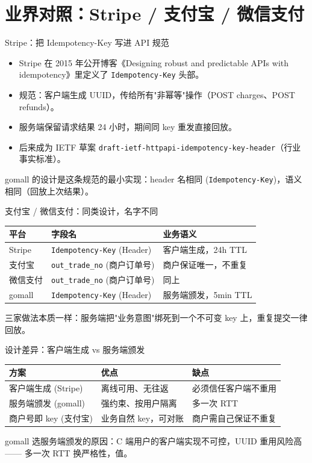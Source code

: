 \section{业界对照：Stripe / 支付宝 / 微信支付}

\begin{frame}{Stripe：把 Idempotency-Key 写进 API 规范}
\begin{itemize}
  \item Stripe 在 2015 年公开博客《Designing robust and predictable APIs with idempotency》里定义了 \texttt{Idempotency-Key} 头部。
  \item 规范：客户端生成 UUID，传给所有"非幂等"操作（POST charges、POST refunds）。
  \item 服务端保留请求结果 24 小时，期间同 key 重发直接回放。
  \item 后来成为 IETF 草案 \texttt{draft-ietf-httpapi-idempotency-key-header}（行业事实标准）。
\end{itemize}
\vspace{2mm}
\small gomall 的设计是这条规范的最小实现：header 名相同 (\texttt{Idempotency-Key})，语义相同（回放上次结果）。
\end{frame}

\begin{frame}{支付宝 / 微信支付：同类设计，名字不同}
\begin{tabular}{@{}lll@{}}
\toprule
平台 & 字段名 & 业务语义 \\
\midrule
Stripe & \texttt{Idempotency-Key} (Header) & 客户端生成，24h TTL \\
支付宝 & \texttt{out\_trade\_no} (商户订单号) & 商户保证唯一，不重复 \\
微信支付 & \texttt{out\_trade\_no} (商户订单号) & 同上 \\
gomall & \texttt{Idempotency-Key} (Header) & 服务端颁发，5min TTL \\
\bottomrule
\end{tabular}
\vspace{2mm}
\small 三家做法本质一样：服务端把"业务意图"绑死到一个不可变 key 上，重复提交一律回放。
\end{frame}

\begin{frame}{设计差异：客户端生成 vs 服务端颁发}
\begin{tabular}{@{}lll@{}}
\toprule
方案 & 优点 & 缺点 \\
\midrule
客户端生成 (Stripe) & 离线可用、无往返 & 必须信任客户端不重用 \\
服务端颁发 (gomall) & 强约束、按用户隔离 & 多一次 RTT \\
商户号即 key (支付宝) & 业务自然 key，可对账 & 商户需自己保证不重复 \\
\bottomrule
\end{tabular}
\vspace{2mm}
\small gomall 选服务端颁发的原因：C 端用户的客户端实现不可控，UUID 重用风险高 —— 多一次 RTT 换严格性，值。
\end{frame}

